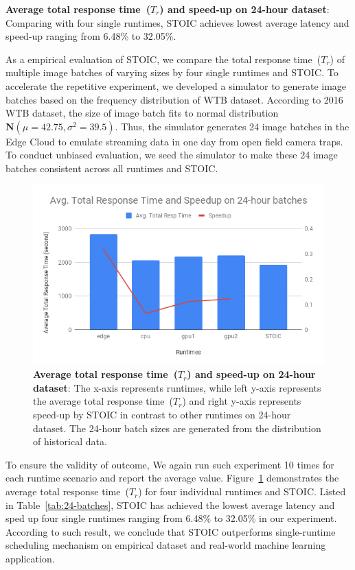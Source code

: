 \begin{table}[t]
    \centering
    
    \caption{\textbf{Average total response time~($T_r$) and speed-up on 24-hour dataset}: Comparing with four single runtimes, STOIC achieves lowest average latency and speed-up ranging from 6.48\% to 32.05\%. }
    \label{tab:24-batches}
\end{table}


As a empirical evaluation of STOIC, we compare the total response time~($T_r$) of multiple image batches of varying sizes by four single runtimes and STOIC. To accelerate the repetitive experiment, we developed a simulator to generate image batches based on the frequency distribution of WTB dataset. According to 2016 WTB dataset, the size of image batch fits to normal distribution $\mathbf{N}(\mu = 42.75, \sigma^2 = 39.5)$. Thus, the simulator generates 24 image batches in the Edge Cloud to emulate streaming data in one day from open field camera traps. To conduct unbiased evaluation, we seed the simulator to make these 24 image batches consistent across all runtimes and STOIC. 

\begin{figure}[t] \centering 
\includegraphics[scale=0.42]{figures/24-batches}
\caption{\textbf{Average total response time~($T_r$) and speed-up on 24-hour dataset}: The x-axis represents runtimes, while left y-axis represents the average total response time~($T_r$) and right y-axis represents speed-up by STOIC in contrast to other runtimes on 24-hour dataset. The 24-hour batch sizes are generated from the distribution of historical data. 
\label{fig:24-batch}}
\end{figure}

To ensure the validity of outcome, We again run such experiment 10 times for each runtime scenario and report the average value. Figure~\ref{fig:24-batch} demonstrates the average total response time~($T_r$) for four individual runtimes and STOIC. Listed in Table~\ref{tab:24-batches}, STOIC has achieved the lowest average latency and sped up four single runtimes ranging from 6.48\% to 32.05\% in our experiment. According to such result, we conclude that STOIC outperforms single-runtime scheduling mechanism on empirical dataset and real-world machine learning application.
